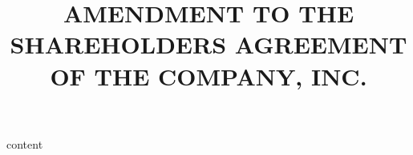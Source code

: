 \documentclass[12pt]{scrartcl}
\title{AMENDMENT TO THE SHAREHOLDERS AGREEMENT\\OF THE COMPANY, INC.}
\begin{document}
\maketitle
{content}
\end{document}
